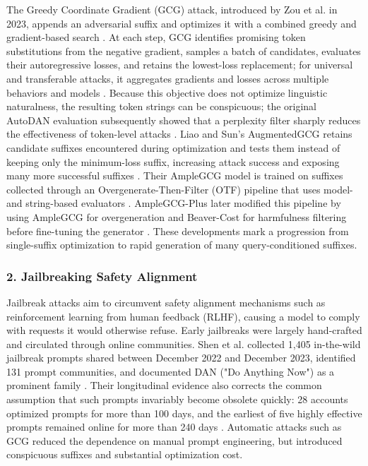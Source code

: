 \documentclass[11pt,a4paper]{article}
\begin{document}
The Greedy Coordinate Gradient (GCG) attack, introduced by Zou et al. in 2023, appends an adversarial suffix and optimizes it with a combined greedy and gradient-based search \cite{Zou_2023_Universal_ab8745c2}. At each step, GCG identifies promising token substitutions from the negative gradient, samples a batch of candidates, evaluates their autoregressive losses, and retains the lowest-loss replacement; for universal and transferable attacks, it aggregates gradients and losses across multiple behaviors and models \cite{Zou_2023_Universal_ab8745c2}. Because this objective does not optimize linguistic naturalness, the resulting token strings can be conspicuous; the original AutoDAN evaluation subsequently showed that a perplexity filter sharply reduces the effectiveness of token-level attacks \cite{Liu_2024_AutoDAN_1d6cff47}. Liao and Sun's AugmentedGCG retains candidate suffixes encountered during optimization and tests them instead of keeping only the minimum-loss suffix, increasing attack success and exposing many more successful suffixes \cite{Liao_2024_AmpleGCG_938d71d1}. Their AmpleGCG model is trained on suffixes collected through an Overgenerate-Then-Filter (OTF) pipeline that uses model- and string-based evaluators \cite{Liao_2024_AmpleGCG_938d71d1}. AmpleGCG-Plus later modified this pipeline by using AmpleGCG for overgeneration and Beaver-Cost for harmfulness filtering before fine-tuning the generator \cite{Kumar_2024_LLMs_67538c80}. These developments mark a progression from single-suffix optimization to rapid generation of many query-conditioned suffixes.

\subsubsection{2. Jailbreaking Safety Alignment}

Jailbreak attacks aim to circumvent safety alignment mechanisms such as reinforcement learning from human feedback (RLHF), causing a model to comply with requests it would otherwise refuse. Early jailbreaks were largely hand-crafted and circulated through online communities. Shen et al. collected 1,405 in-the-wild jailbreak prompts shared between December 2022 and December 2023, identified 131 prompt communities, and documented DAN ("Do Anything Now") as a prominent family \cite{Shen_2024_DoAnything_0f50aa08}. Their longitudinal evidence also corrects the common assumption that such prompts invariably become obsolete quickly: 28 accounts optimized prompts for more than 100 days, and the earliest of five highly effective prompts remained online for more than 240 days \cite{Shen_2024_DoAnything_0f50aa08}. Automatic attacks such as GCG reduced the dependence on manual prompt engineering, but introduced conspicuous suffixes and substantial optimization cost.
\end{document}
